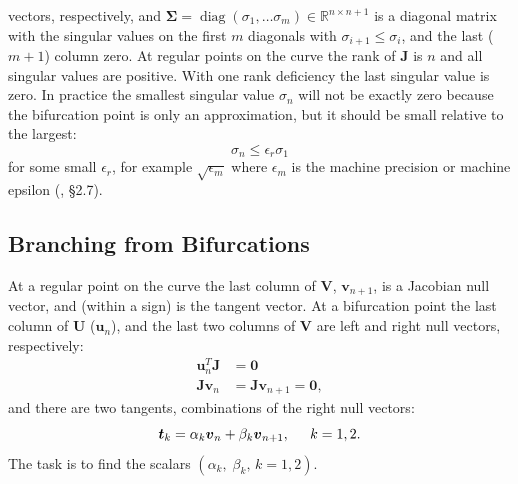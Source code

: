 \documentclass[10pt,openany,twoside]{book}
\numberwithin{equation}{section}   %
\newcommand{\Diag}{\operatorname{diag}}
\newcommand{\Matrix}[1]{\boldsymbol{#1}}
\newcommand{\Vector}[1]{\boldsymbol{#1}}
\begin{document}
vectors, respectively, and
$\Matrix{\Sigma} = \Diag (\sigma_1, \dots \sigma_m) \in \mathbb{R}^{n \times n+1}$
is a diagonal matrix with the singular values on the first $m$ diagonals
with $\sigma_{i+1} \le \sigma_i$,
and the last ($m+1$) column zero.
At regular points on the curve
the rank of $\Matrix{J}$ is $n$ and all singular values
are positive.
With one rank deficiency the last singular value is zero.
In practice the smallest singular value $\sigma_n$ will not be exactly zero
because the bifurcation point is only an approximation, but it
should be small relative to the largest:
\begin{equation*}
\sigma_n \leq \epsilon_r \sigma_1
\end{equation*}
for some small $\epsilon_r$, for example $\sqrt{\epsilon_m}$
where $\epsilon_m$ is the machine precision or machine epsilon
(\cite{golub2013matrix}, \S 2.7).

\subsection{Branching from Bifurcations}
At a regular point on the curve the last column of $\Matrix{V}$, $\Vector{v}_{n+1}$,
is a Jacobian null vector,
and (within a sign) is the tangent vector.
At a bifurcation point the last column of $\Matrix{U}$ ($\Vector{u}_n$),
and the last two columns of $\Matrix{V}$ are left and right null vectors, respectively:
\begin{align}
\Vector{u}_n^T\Matrix{J} &= \Vector{0} \nonumber \\
\Matrix{J}\Vector{v}_n &= \Matrix{J} \Vector{v}_{n+1} = \Vector{0},
\end{align}
and there are two tangents,
combinations of the right null vectors:
\begin{equation}
\label{eqn:tanb}
\Vector{t}_k = \alpha_k \Vector{v}_n + \beta_k \Vector{v}_{n+1}, \hspace{0.2in} k=1,2.
\end{equation}
The task is to find the scalars $(\alpha_k,\; \beta_k,\, k=1,2)$.
\end{document}
